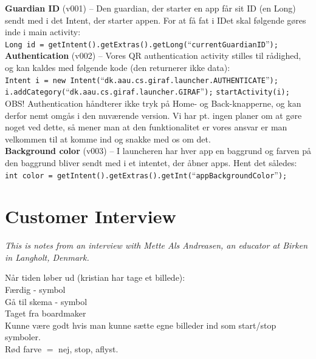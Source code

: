 \textbf{Guardian ID} (v001) -- Den guardian, der starter en app f\aa{}r sit ID (en Long) sendt med i det Intent, der starter appen. For at f\aa{} fat i IDet skal f\o{}lgende g\o{}res inde i main activity:\\

	\verb+Long id = getIntent().getExtras().getLong(+``\verb+currentGuardianID+''\verb+);+\\
	
\textbf{Authentication} (v002) -- Vores QR authentication activity stilles til r\aa{}dighed, og kan kaldes med f\o{}lgende kode (den returnerer ikke data):\\

	\verb+Intent i = new Intent(+``\verb+dk.aau.cs.giraf.launcher.AUTHENTICATE+''\verb+);+
	\verb+i.addCategory(+``\verb+dk.aau.cs.giraf.launcher.GIRAF+''\verb+);+
	\verb+startActivity(i);+\\
	
OBS! Authentication h\aa{}ndterer ikke tryk p\aa{} Home- og Back-knapperne, og kan derfor nemt omg\aa{}s i den nuv\ae{}rende version. Vi har pt. ingen planer om at g\o{}re noget ved dette, s\aa{} mener man at den funktionalitet er vores ansvar er man velkommen til at komme ind og snakke med os om det.\\

\textbf{Background color} (v003) -- I launcheren har hver app en baggrund og farven p\aa{} den baggrund bliver sendt med i et intentet, der \aa{}bner apps. Hent det s\aa{}ledes:\\

\verb+int color = getIntent().getExtras().getInt(+``\verb+appBackgroundColor+''\verb+);+

\chapter{Customer Interview}
\label{InterviewMette}
\textit{This is notes from an interview with Mette Als Andreasen, an educator at Birken in Langholt, Denmark.}

Når tiden løber ud (kristian har tage et billede):\\
Færdig - symbol\\
Gå til skema - symbol\\
Taget fra boardmaker\\

Kunne være godt hvis man kunne sætte egne billeder ind som start/stop symboler.\\


Rød farve $=$ nej, stop, aflyst.\\

